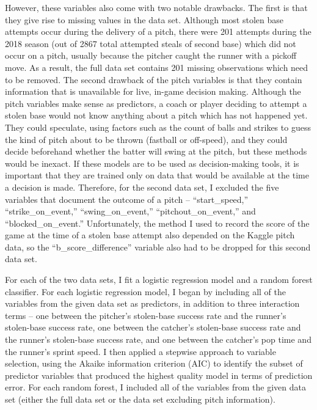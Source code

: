 \documentclass{article}
\begin{document}
However, these variables also come with two notable drawbacks. The first is that they give rise to missing values in the data set. Although most stolen base attempts occur during the delivery of a pitch, there were 201 attempts during the 2018 season (out of 2867 total attempted steals of second base) which did not occur on a pitch, usually because the pitcher caught the runner with a pickoff move. As a result, the full data set contains 201 missing observations which need to be removed. The second drawback of the pitch variables is that they contain information that is unavailable for live, in-game decision making. Although the pitch variables make sense as predictors, a coach or player deciding to attempt a stolen base would not know anything about a pitch which has not happened yet. They could speculate, using factors such as the count of balls and strikes to guess the kind of pitch about to be thrown (fastball or off-speed), and they could decide beforehand whether the batter will swing at the pitch, but these methods would be inexact. If these models are to be used as decision-making tools, it is important that they are trained only on data that would be available at the time a decision is made. Therefore, for the second data set, I excluded the five variables that document the outcome of a pitch – “start\_speed,” “strike\_on\_event,” “swing\_on\_event,” “pitchout\_on\_event,” and “blocked\_on\_event.” Unfortunately, the method I used to record the score of the game at the time of a stolen base attempt also depended on the Kaggle pitch data, so the “b\_score\_difference” variable also had to be dropped for this second data set.

For each of the two data sets, I fit a logistic regression model and a random forest classifier. For each logistic regression model, I began by including all of the variables from the given data set as predictors, in addition to three interaction terms – one between the pitcher's stolen-base success rate and the runner's stolen-base success rate, one between the catcher's stolen-base success rate and the runner's stolen-base success rate, and one between the catcher's pop time and the runner's sprint speed. I then applied a stepwise approach to variable selection, using the Akaike information criterion (AIC) to identify the subset of predictor variables that produced the highest quality model in terms of prediction error. For each random forest, I included all of the variables from the given data set (either the full data set or the data set excluding pitch information). 
\end{document}
